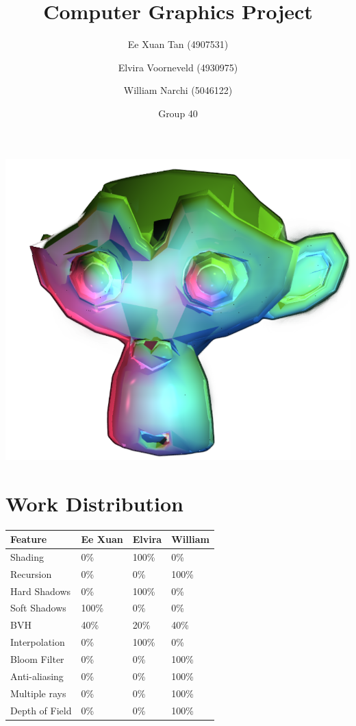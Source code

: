 \documentclass{article}
\author{Ee Xuan Tan (4907531) \and Elvira Voorneveld (4930975) \and William Narchi (5046122)}
\date{Group 40}
\title{Computer Graphics Project}
\begin{document}
    \maketitle
    \begin{center}
      \includegraphics[scale=0.60]{images/monkey_cover}
    \end{center}
    
    \newpage

    \section{Work Distribution}
    \begin{tabular}{ |p{2.5cm}||p{2.5cm}|p{2.5cm}|p{2.5cm}| }
        \hline
        \textbf{Feature} &\textbf{Ee Xuan} &\textbf{Elvira} &\textbf{William}\\
        \hline
        Shading                        &0\%    &100\%  &0\%\\
        Recursion                      &0\%    &0\%    &100\%\\
        Hard Shadows                   &0\%    &100\%  &0\%\\
        Soft Shadows                   &100\%  &0\%    &0\%\\
        BVH                            &40\%   &20\%   &40\%\\
        Interpolation                  &0\%    &100\%  &0\%\\
        Bloom Filter                   &0\%    &0\%    &100\%\\
        Anti-aliasing                  &0\%    &0\%    &100\%\\
        Multiple rays                  &0\%    &0\%    &100\%\\
        Depth of Field                 &0\%    &0\%    &100\%\\
        \hline
    \end{tabular}
\end{document}

